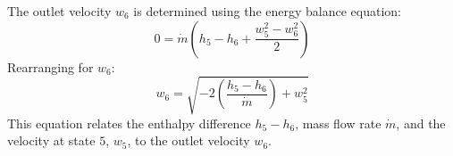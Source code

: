 The outlet velocity \( w_6 \) is determined using the energy balance equation:  
\[
0 = \dot{m} \left( h_5 - h_6 + \frac{w_5^2 - w_6^2}{2} \right)
\]  
Rearranging for \( w_6 \):  
\[
w_6 = \sqrt{-2 \left( \frac{h_5 - h_6}{\dot{m}} \right) + w_5^2}
\]  
This equation relates the enthalpy difference \( h_5 - h_6 \), mass flow rate \( \dot{m} \), and the velocity at state \( 5 \), \( w_5 \), to the outlet velocity \( w_6 \).